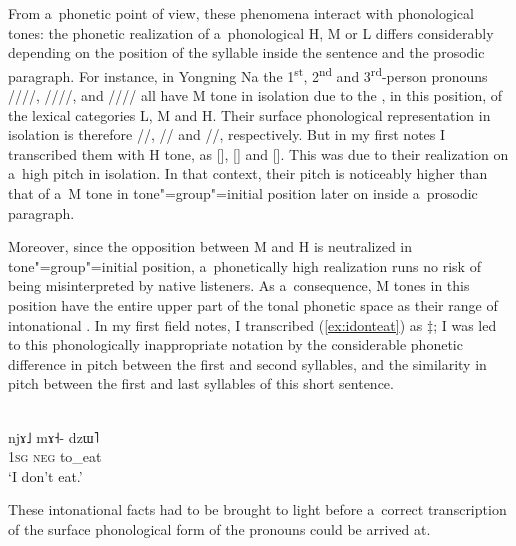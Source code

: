 From a~phonetic point of view, these phenomena interact with phonological tones: the phonetic
realization of a~phonological H, M or L differs considerably depending on the position of the
syllable inside the sentence and the prosodic paragraph. For instance, in Yongning Na the 1\textsuperscript{st}, 2\textsuperscript{nd} and 3\textsuperscript{rd}-person pronouns ////, ////, and //// all have M tone in isolation due to the ,
in this position, of the lexical categories L, M and H. Their surface phonological representation in isolation is therefore //, // and
//, respectively. But in my first notes I transcribed them with H tone, as [],
[] and []. This was due to their realization on a~high pitch in isolation. In that
context, their pitch is noticeably higher than that of a~M tone in tone"=group"=initial position later
on inside a~prosodic paragraph.

Moreover, since the opposition
between M and H is neutralized in tone"=group"=initial position, a~phonetically high realization
runs no risk of being misinterpreted by native listeners. As a~consequence, M tones in this
position have the entire upper part of the tonal phonetic space as their range of intonational
. In my first field notes, I transcribed (\ref{ex:idonteat}) as $\ddagger${\kern2pt}; I was led to
this phonologically inappropriate notation by the considerable phonetic difference in pitch between the first and
second syllables, and the similarity in pitch between the first and last syllables of this short
sentence.

\begin{exe}
	\ex
	\label{ex:idonteat}
	\\ 
	\gll njɤ˩	mɤ˧-	dzɯ˥\\
	\textsc{1sg}		\textsc{neg}		to\_eat\\
	\glt ‘I don’t eat.’
\end{exe}

These intonational facts had to be brought to light before a~correct transcription of the
surface phonological form of the pronouns could be arrived at. 


